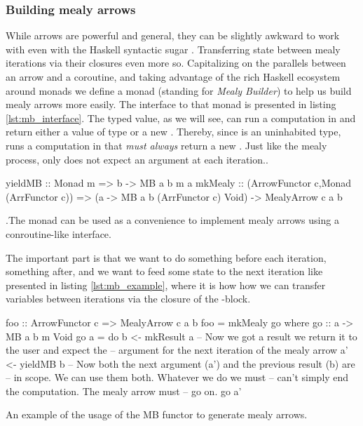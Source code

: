 \subsubsection{Building mealy arrows}

While arrows are powerful and general, they can be slightly awkward to
work with even with the Haskell  syntactic sugar
\cite{bibtex}. Transferring state between mealy iterations via their
closures even more so. Capitalizing on the parallels between an arrow
and a coroutine, and taking advantage of the rich Haskell ecosystem
around monads we define a monad  (standing for \emph{Mealy Builder})
to help us build mealy
arrows more easily. The interface to that monad is presented in
listing \ref{lst:mb_interface}. The  typed value, as we will
see, can run a computation in  and return either a value of type
 or a new . Thereby, since  is an
uninhabited type,  runs a computation in 
that \emph{must always} return a new . Just like the
mealy process, only  does not expect an argument at
each iteration..

\begin{code}
\begin{haskellcode}
yieldMB :: Monad m => b -> MB a b m a
mkMealy :: (ArrowFunctor c,Monad (ArrFunctor c))
        => (a -> MB a b (ArrFunctor c) Void)
        -> MealyArrow c a b
\end{haskellcode}
  \caption{\label{lst:mb_interface}.The  monad can be
    used as a convenience to implement mealy arrows using a
    conroutine-like interface.}
\end{code}

The important part is that we want to do something before each
iteration, something after, and we want to feed some state to the next
iteration like presented in listing \ref{lst:mb_example}, where it is
how how we can transfer variables between iterations via the closure
of the -block.

\begin{code}
\begin{haskellcode}
foo :: ArrowFunctor c => MealyArrow c a b
foo = mkMealy go where
  go :: a -> MB a b m Void
  go a = do
    b <- mkResult a
    -- Now we got a result we return it to the user and expect the
    -- argument for the next iteration of the mealy arrow
    a' <- yieldMB b
    -- Now both the next argument (a') and the previous result (b) are
    -- in scope. We can use them both. Whatever we do we must
    -- can't simply end the computation. The mealy arrow must
    -- go on.
    go a'
\end{haskellcode}
  \caption{\label{lst:mb_example}An example of the usage of the MB
    functor to generate mealy arrows.}
\end{code}


